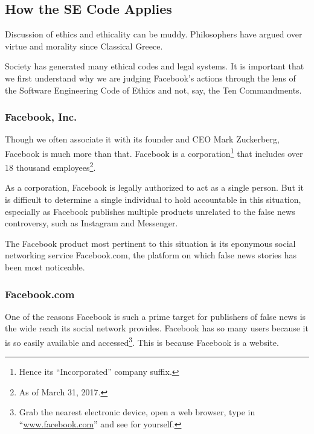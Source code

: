 

\subsection{How the SE Code Applies}

\par Discussion of ethics and ethicality can be muddy. Philosophers have argued over virtue and morality since Classical Greece.\citeneeded

\par Society has generated many ethical codes and legal systems. It is important that we first understand why we are judging Facebook's actions through the lens of the Software Engineering Code of Ethics and not, say, the Ten Commandments.

\subsubsection{Facebook, Inc.}

\par Though we often associate it with its founder and CEO Mark Zuckerberg, Facebook is much more than that. Facebook is a corporation\footnote{Hence its ``Incorporated'' company suffix.} that includes over 18 thousand employees\footnote{As of March 31, 2017.}. \cite{fb_about} 

\par As a corporation, Facebook is legally authorized to act as a single person. \cite{dictionary} But it is difficult to determine a single individual to hold accountable in this situation, especially as Facebook publishes multiple products unrelated to the false news controversy, such as Instagram and Messenger. \cite{fb_about}

\par The Facebook product most pertinent to this situation is its eponymous social networking service Facebook.com, the platform on which false news stories has been most noticeable. \cite{tc_facebook_responsibility}

\subsubsection{Facebook.com}

\par One of the reasons Facebook is such a prime target for publishers of false news is the wide reach its social network provides. \cite{telegraph_fake_news} Facebook has so many users because it is so easily available and accessed\footnote{Grab the nearest electronic device, open a web browser, type in ``\url{www.facebook.com}'' and see for yourself.}. This is because Facebook is a website.

